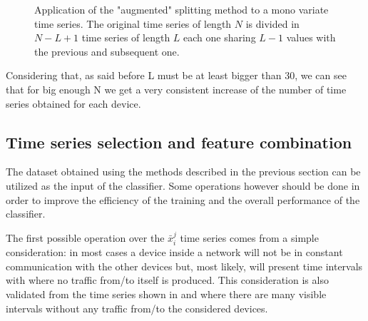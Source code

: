\begin{figure}[h]
\vspace{-7mm}
    \centering

\caption{Application of the "augmented" splitting method to a mono variate time series. The original time series of length $N$ is divided in $N-L+1$ time series of length $L$ each one sharing $L-1$ values with the previous and subsequent one.}
    \label{fig:ts_split_aug}
    \vspace{-10mm}
\end{figure}
\newpage
Considering that, as said before L must be at least bigger than 30, we can see that for big enough N we get a very consistent increase of the number of time series obtained for each device. 

%
%


\subsection{Time series selection and feature combination}

The dataset obtained using the methods described in the previous section can be utilized as the input of the classifier. Some operations however should be done in order to improve the efficiency of the training and the overall performance of the classifier.

The first possible operation over the $\bar{x}_i^j$ time series comes from a simple consideration: in most cases a device inside a network will not be in constant communication with the other devices but, most likely, will present time intervals with where no traffic from/to itself is produced. This consideration is also validated from the time series shown in  and  where there are many visible intervals without any traffic from/to the considered devices.

